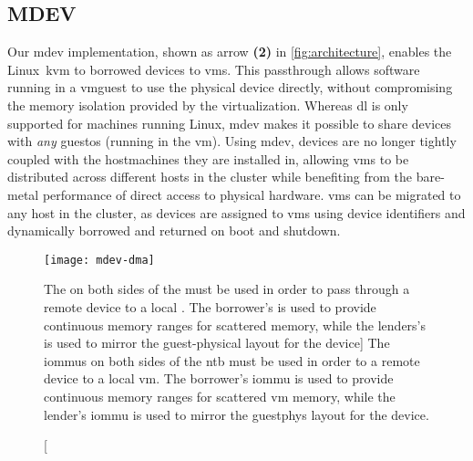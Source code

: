 \subsection{MDEV}\label{sec:mdev}
Our \gls{mdev} implementation, shown as arrow \textbf{(2)} in \cref{fig:architecture}, enables the Linux~\gls{kvm} to \emph{} borrowed devices to \glspl{vm}.
%
This \gls{passthrough} allows software running in a \gls{vmguest} to use the physical device directly, without compromising the memory isolation provided by the virtualization.
%
Whereas \gls{dl} is only supported for machines running Linux, \gls{mdev} makes it possible to share devices with \emph{any} \gls{guestos} (running in the \gls{vm}).
%
Using \gls{mdev}, devices are no longer tightly coupled with the \glspl{hostmachine} they are installed in, allowing \glspl{vm} to be distributed across different \glspl{host} in the cluster while benefiting from the bare-metal performance of direct access to physical hardware.
%
\Glspl{vm} can be migrated to any \gls{host} in the cluster, as devices are assigned to \glspl{vm} using device identifiers and dynamically borrowed and returned on boot and shutdown.

\begin{figure}
    \centering
    \texttt{[image: mdev-dma]}
    \caption
    [The  on both sides of the  must be used in order to pass through a remote device to a local . The borrower's  is used to provide continuous memory ranges for scattered  memory, while the lenders's  is used to mirror the guest-physical layout for the device]
    {The \glspl{iommu} on both sides of the \gls{ntb} must be used in order to  a remote device to a local \gls{vm}. The \gls{borrower}'s \gls{iommu} is used to provide continuous memory ranges for scattered \gls{vm} memory, while the \gls{lender}'s \gls{iommu} is used to mirror the \gls{guestphys} layout for the device.}
    \label{fig:mdev-dma}
\end{figure}


